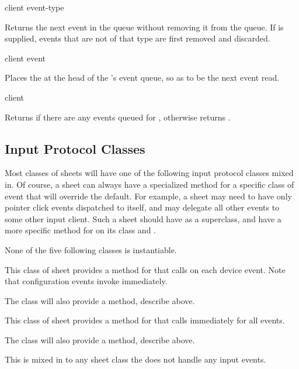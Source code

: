  {client \optional event-type}

Returns the next event in the queue without removing it from the queue.  If
 is supplied, events that are not of that type are first
removed and discarded.

 {client event}

Places the  at the head of the 's event queue, so as to
be the next event read.

 {client}

Returns  if there are any events queued for , otherwise
returns .


\subsection {Input Protocol Classes}

Most classes of sheets will have one of the following input protocol classes
mixed in.  Of course, a sheet can always have a specialized method for a
specific class of event that will override the default.  For example, a sheet
may need to have only pointer click events dispatched to itself, and may
delegate all other events to some other input client.  Such a sheet should have
 as a superclass, and have a more specific method
for  on its class and .

None of the five following classes is instantiable.


This class of sheet provides a method for  that calls
 on each device event.  Note that configuration events invoke
 immediately.

The  class will also provide a
 method, describe above.


This class of sheet provides a method for  that calls
 immediately for all events.

The  class will also provide a
 method, describe above.


This is mixed in to any sheet class the does not handle any input events.

